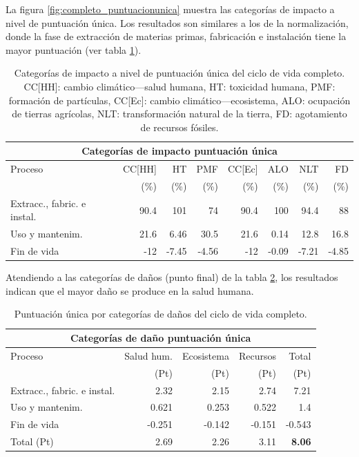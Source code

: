 La figura \ref{fig:completo_puntuacionunica} muestra las categorías de impacto a nivel de puntuación única. Los resultados son similares a los de la normalización, donde la fase de extracción de materias primas, fabricación e instalación tiene la mayor puntuación (ver tabla \ref{categoriasimpactocompletopuntunica}).

\begin{table}[!htb]
\centering
\begin{tabular}{p{4cm}rrrrrrr}
\toprule
\multicolumn{8}{c}{Categorías de impacto puntuación única}\\
\midrule
Proceso & CC[HH] & HT & PMF & CC[Ec] & ALO & NLT & FD\\
 &  (\%) & (\%) & (\%) & (\%) & (\%) & (\%) & (\%)\\
\midrule
Extracc., fabric. e instal. & 90.4 & 101 & 74 & 90.4 & 100 & 94.4 & 88\\
Uso y mantenim. & 21.6 & 6.46 & 30.5 & 21.6 & 0.14 & 12.8 & 16.8\\
Fin de vida & -12 & -7.45 & -4.56 & -12 & -0.09 & -7.21 & -4.85\\
\bottomrule
\end{tabular}
\caption[Categorías de impacto a nivel de puntuación única del ciclo de vida completo.]{Categorías de impacto a nivel de puntuación única del ciclo de vida completo. CC[HH]: cambio climático—salud humana, HT: toxicidad humana, PMF: formación de partículas, CC[Ec]: cambio climático—ecosistema, ALO: ocupación de tierras agrícolas, NLT: transformación natural de la tierra, FD: agotamiento de recursos fósiles.}
\label{categoriasimpactocompletopuntunica}
\end{table}

Atendiendo a las categorías de daños (punto final) de la tabla \ref{categoriasdanoscompleto}, los resultados indican que el mayor daño se produce en la salud humana.

\begin{table}[!htb]
\centering
\begin{tabular}{p{6cm}rrrr}
\toprule
\multicolumn{5}{c}{Categorías de daño puntuación única}\\
\midrule
Proceso & Salud hum. & Ecosistema & Recursos & Total\\
 & (Pt) & (Pt) &  (Pt) & (Pt)\\
\midrule
Extracc., fabric. e instal. & 2.32 & 2.15 & 2.74 & 7.21\\
Uso y mantenim. & 0.621 & 0.253 & 0.522 & 1.4\\
Fin de vida & -0.251 & -0.142 & -0.151 & -0.543\\
\midrule
Total (Pt) & 2.69 & 2.26 & 3.11 & \textbf{8.06}\\
\bottomrule
\end{tabular}
\caption{Puntuación única por categorías de daños del ciclo de vida completo.}
\label{categoriasdanoscompleto}
\end{table}

